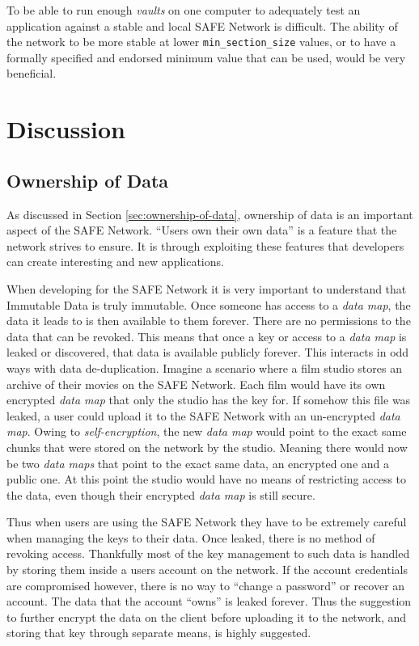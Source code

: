 To be able to run enough \textit{vaults} on one computer to adequately test an application against a stable and local SAFE Network is difficult. The ability of the network to be more stable at lower \texttt{min\_section\_size} values, or to have a formally specified and endorsed minimum value that can be used, would be very beneficial.

\section{Discussion}

\subsection{Ownership of Data}

As discussed in Section \ref{sec:ownership-of-data}, ownership of data is an important aspect of the SAFE Network. ``Users own their own data'' is a feature that the network strives to ensure. It is through exploiting these features that developers can create interesting and new applications.

When developing for the SAFE Network it is very important to understand that Immutable Data is truly immutable. Once someone has access to a \textit{data map}, the data it leads to is then available to them forever. There are no permissions to the data that can be revoked. This means that once a key or access to a \textit{data map} is leaked or discovered, that data is available publicly forever. This interacts in odd ways with data de-duplication. Imagine a scenario where a film studio stores an archive of their movies on the SAFE Network. Each film would have its own encrypted \textit{data map} that only the studio has the key for. If somehow this file was leaked, a user could upload it to the SAFE Network with an un-encrypted \textit{data map}. Owing to \textit{self-encryption}, the new \textit{data map} would point to the exact same chunks that were stored on the network by the studio. Meaning there would now be two \textit{data maps} that point to the exact same data, an encrypted one and a public one. At this point the studio would have no means of restricting access to the data, even though their encrypted \textit{data map} is still secure.

Thus when users are using the SAFE Network they have to be extremely careful when managing the keys to their data. Once leaked, there is no method of revoking access. Thankfully most of the key management to such data is handled by storing them inside a users account on the network. If the account credentials are compromised however, there is no way to ``change a password'' or recover an account. The data that the account ``owns'' is leaked forever. Thus the suggestion to further encrypt the data on the client before uploading it to the network, and storing that key through separate means, is highly suggested.

